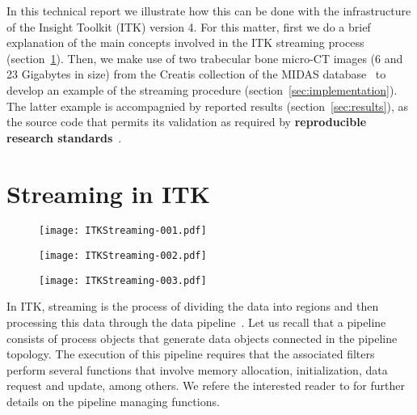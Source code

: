 \documentclass{InsightArticle}
\begin{document}
In this technical report we illustrate how this can be done with the 
infrastructure of the Insight Toolkit (ITK) version 4. For this matter, first we do a
brief explanation of the main concepts involved in the ITK streaming process
(section~\ref{sec:stream}). Then, we make use of two trabecular bone micro-CT images
(6 and 23 Gigabytes in size) from the Creatis collection of the MIDAS
database~\cite{Zuluaga2011a} to develop an example of the streaming procedure
(section~\ref{sec:implementation}). The latter example is accompagnied by 
reported results (section~\ref{sec:results}), as the source code
that permits its validation as required by \textbf{reproducible research
standards}~\cite{Stodden2009}.

\section{Streaming in ITK}
\label{sec:stream}

\begin{figure}
\center
\texttt{[image: ITKStreaming-001.pdf]}
\label{fig:StreamingFigure1}
\end{figure}

\begin{figure}
\center
\texttt{[image: ITKStreaming-002.pdf]}
\label{fig:StreamingFigure1}
\end{figure}

\begin{figure}
\center
\texttt{[image: ITKStreaming-003.pdf]}
\label{fig:StreamingFigure1}
\end{figure}



In ITK, streaming is the process of dividing the data into regions and then 
processing this data through the data pipeline~\cite{Ibanez2005}. Let us recall
that a pipeline consists of process objects that generate data objects connected
in the pipeline topology. The execution of this pipeline requires that the
associated filters perform several functions that involve memory allocation,
initialization, data request and update, among others. We refere the interested
reader to \cite{Ibanez2005} for further details on the pipeline managing
functions.
\end{document}
